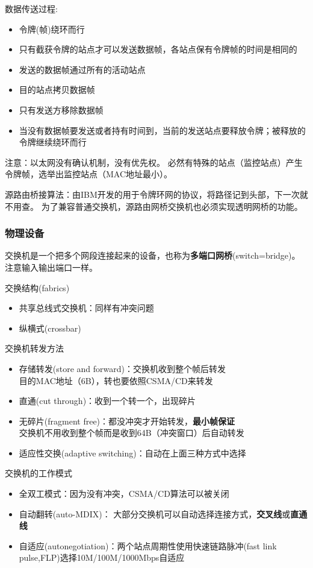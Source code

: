 数据传送过程:
\begin{itemize}
	\item 令牌(帧)绕环而行
	\item 只有截获令牌的站点才可以发送数据帧，各站点保有令牌帧的时间是相同的
	\item 发送的数据帧通过所有的活动站点
	\item 目的站点拷贝数据帧
	\item 只有发送方移除数据帧
	\item 当没有数据帧要发送或者持有时间到，当前的发送站点要释放令牌；被释放的令牌继续绕环而行
\end{itemize}

注意：以太网没有确认机制，没有优先权。
必然有特殊的站点（监控站点）产生令牌帧，选举出监控站点（MAC地址最小）。

源路由桥接算法：由IBM开发的用于令牌环网的协议，将路径记到头部，下一次就不用查。
为了兼容普通交换机，源路由网桥交换机也必须实现透明网桥的功能。

\subsubsection{物理设备}
\label{subsub:physical_equipment}
交换机是一个把多个网段连接起来的设备，也称为\textbf{多端口网桥}(switch=bridge)。
注意输入输出端口一样。

交换结构(fabrics)
\begin{itemize}
	\item 共享总线式交换机：同样有冲突问题
	\item 纵横式(crossbar)
\end{itemize}

交换机转发方法
\begin{itemize}
\item 存储转发(store and forward)：交换机收到整个帧后转发\\
目的MAC地址（6B），转也要依照CSMA/CD来转发
\item 直通(cut through)：收到一个转一个，出现碎片
\item 无碎片(fragment free)：都没冲突才开始转发，\textbf{最小帧保证}\\
交换机不用收到整个帧而是收到64B（冲突窗口）后自动转发
\item 适应性交换(adaptive switching)：自动在上面三种方式中选择
\end{itemize}

交换机的工作模式
\begin{itemize}
\item 全双工模式：因为没有冲突，CSMA/CD算法可以被关闭
\item 自动翻转(auto-MDIX)：
大部分交换机可以自动选择连接方式，\textbf{交叉线}或\textbf{直通线}
\item 自适应(autonegotiation)：两个站点周期性使用快速链路脉冲(fast link pulse,FLP)选择10M/100M/1000Mbps自适应
\end{itemize}

